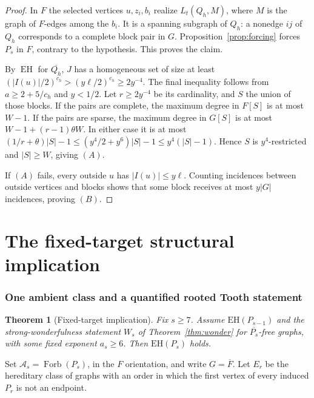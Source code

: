 \documentclass[11pt,a4paper]{article}
\newtheorem{theorem}{Theorem}[section]
\theoremstyle{definition}
\theoremstyle{remark}
\numberwithin{equation}{section}
\newcommand{\EH}{\mathrm{EH}}
\begin{document}
\begin{proof}
In \(F\) the selected vertices \(u,\allowbreak z_{i},\allowbreak b_{i}\) realize \(L_{t}(Q_{h},\allowbreak M)\), where \(M\) is the graph of \(F\)-edges among the \(b_{i}\). It is a spanning subgraph of \(Q_{h}\): a nonedge \(ij\) of \(Q_{h}\) corresponds to a complete block pair in \(G\). Proposition~\ref{prop:forcing} forces \(P_{s}\) in \(F\), contrary to the hypothesis. This proves the claim.

By \(\operatorname{EH}\) for \(\overline{Q_{h}}\), \(J\) has a homogeneous set of size at least \((|I(u)|/2)^{c_{h}} > (y \ell/2)^{c_{h}} \ge\allowbreak  2 y^{-4}\). The final inequality follows from \(a\ge\allowbreak 2+5/c_{h}\) and \(y<1/2\). Let \(r\ge\allowbreak 2 y^{-4}\) be its cardinality, and \(S\) the union of those blocks. If the pairs are complete, the maximum degree in \(F[S]\) is at most \(W-1\). If the pairs are sparse, the maximum degree in \(G[S]\) is at most \(W-1+(r-1)\theta W\). In either case it is at most \((1/r+\theta)|S|-1 \le\allowbreak  (y^{4}/2+y^{6})|S|-1 \le\allowbreak  y^{4}(|S|-1)\). Hence \(S\) is \(y^{4}\)-restricted and \(|S|\ge\allowbreak W\), giving \((A)\).

If \((A)\) fails, every outside \(u\) has \(|I(u)|\le\allowbreak y \ell\). Counting incidences between outside vertices and blocks shows that some block receives at most \(y|G|\) incidences, proving \((B)\).
\end{proof}


\part{The fixed-target structural implication}

\section{One ambient class and a quantified rooted Tooth statement}\label{sec:ambient}
\begin{theorem}[Fixed-target implication]\label{thm:step}Fix \(s\ge7\). Assume \(\EH(P_{s-1})\) and the strong-wonderfulness statement \(W_s\) of Theorem~\ref{thm:wonder} for \(\overline{P_s}\)-free graphs, with some fixed exponent \(a_s\ge6\). Then \(\EH(P_s)\) holds.\end{theorem}
Set \(\mathcal{A}_{s}=\operatorname{Forb}(P_{s})\), in the \(F\) orientation, and write \(G=\overline{F}\). Let \(E_{r}\) be the hereditary class of graphs with an order in which the first vertex of every induced \(P_{r}\) is not an endpoint.
\end{document}
